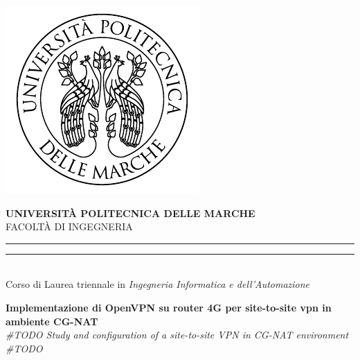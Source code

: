 \begin{titlepage}
    \begin{center}
        \includegraphics[scale=0.85]{immagini/UnivpmLogo.pdf} \\
        \vspace{5mm}

        {{\Large{\textbf{\large{UNIVERSITÀ POLITECNICA DELLE MARCHE}}}}} \\
        \vspace{3mm}
        \small{FACOLTÀ DI INGEGNERIA}
        \vspace{3.5mm}

        \rule[0.1cm]{17cm}{0.1mm}
        \rule[0.5cm]{17cm}{0.6mm}
        \\

        \large{{
                    Corso di Laurea triennale in \textit{Ingegneria Informatica e dell'Automazione}
                }}\\

    \end{center}

    \vspace{18mm}
    \begin{center}

        {
            \LARGE{
                \bf Implementazione di OpenVPN su router 4G per site-to-site vpn in ambiente CG-NAT
            }
        }\\

        \vspace{6mm}
        \Large{
            \textit{
                \#TODO Study and configuration of a site-to-site VPN in CG-NAT environment \#TODO
            }
        }\\

        \vspace{15mm}
    \end{center}
    \vspace{20mm}


\end{titlepage}
